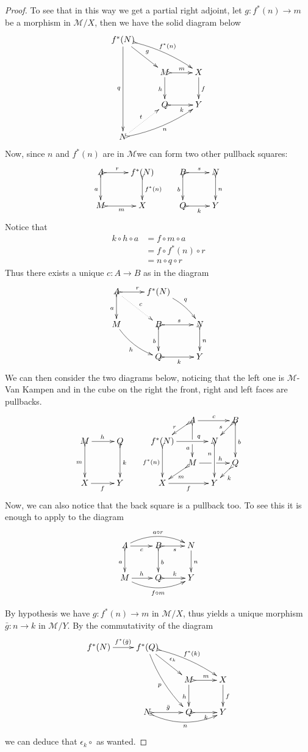 \documentclass[a4paper]{article}
\def\X{\textbf {\textup{X}}}
\theoremstyle{definition}
\begin{document}
\begin{proof}
To see that in this way we get a partial right adjoint, let $g\colon f^*(n)\to m $ be a morphism in $\mathcal{M}/X$, then we have the solid diagram below
\[\xymatrix{f^*(N) \ar[dr]^{g} \ar@{>->}@/^.2cm/[drr]^{f^*(n)} \ar[ddd]_{q}\\& M \ar@{>->}[r]^{m}\ar[d]_{h}& X \ar[d]^f \\&Q\ar@{>->}[r]_{k}&Y\\N \ar@{>->}@/_.2cm/[urr]_{n} \ar@{.>}[ur]^{t}}\]
Now, since $n$ and $f^*(n)$ are in $\mathcal{M}$we can form two other pullback squares:
\[\xymatrix{A \ar@{>->}[d]_{a}\ar@{>->}[r]^-{r}& f^*(N) \ar@{>->}[d]^{f^*(n)} & B \ar@{>->}[r]^{s} \ar@{>->}[d]_{b}& N \ar@{>->}[d]^{n}\\M \ar@{>->}[r]_{m}&X &Q \ar@{>->}[r]_k&Y\\}\]
Notice that 
\begin{align*}
	k\circ h\circ a&=f\circ m\circ a\\&=f\circ f^*(n)\circ r\\&=n\circ q \circ r
\end{align*}
Thus there exists a unique $c\colon A\to B$ as in the diagram
\[\xymatrix{A \ar@{>->}[d]_{a} \ar@{.>}[dr]^{c}\ar@{>->}[r]^{r} &f^*(N) \ar@/^.2cm/[dr]^{q} \\ M \ar@/_.2cm/[dr]_{h}&B\ar@{>->}[r]^{s}  \ar@{>->}[d]_{b}& N \ar@{>->}[d]^{n}\\ &Q \ar@{>->}[r]_{k} & Y}\]
We can then consider the two diagrams below, noticing that the left one is $\mathcal{M}$-Van Kampen and in the cube on the right the front, right and left faces are pullbacks.
		\[\xymatrix@C=10pt@R=10pt{&&&&&A\ar@{>->}[dd]|\hole_(.65){a}\ar[rr]^{c} \ar@{>->}[dl]_{r} && B \ar@{>->}[dd]^{b} \ar@{>->}[dl]_{s} \\ M \ar@{>->}[dd]_{m}\ar[rr]^{h}&&Q\ar@{>->}[dd]^{k}&&f^*(N)  \ar@{>->}[dd]_{f^*(n)}\ar[rr]^(.7){q} & & N \ar@{>->}[dd]_(.3){n}\\&&&&&M\ar[rr]|\hole^(.65){h} \ar@{>->}[dl]^{m} && Q \ar@{>->}[dl]^{k} \\X\ar[rr]_{f} &&Y&&X \ar[rr]_{f} & & Y}\]
Now, we can also notice that the back square is a pullback too. To see this it is enough to apply  to the diagram
\[\xymatrix{A  \ar@/^.4cm/[rr]^{a\circ r}\ar@{>->}[d]_{a} \ar[r]_{c}& \ar@{>->}[r]_{s}B \ar@{>->}[d]^{b}& N \ar[d]^{n}\\ M \ar@/_.4cm/[rr]_{f\circ m}\ar[r]^{h}& Q \ar@{>->}[r]^{k}& Y}\]

By hypothesis we have $g\colon f^*(n)\to m$ in $\mathcal{M}/X$, thus  yields a unique morphism $\bar{g}\colon n\to k$ in $\mathcal{M}/Y$. By the commutativity of the diagram
\[\xymatrix{f^*(N) \ar[r]^{f^*(\bar{g})}& f^*(Q) \ar[dr]^{\epsilon_k} \ar@{>->}@/^.2cm/[drr]^{f^*(k)} \ar@/_.2cm/[ddr]_{p}\\&& M \ar@{>->}[r]^{m}\ar[d]_{h}& X \ar[d]^f \\&N \ar@{>->}[r]^{\bar{g}} \ar@{>->}@/_.4cm/[rr]_{n} &Q\ar@{>->}[r]_{k}&Y}\]
we can deduce that $\epsilon_k \circ $ as wanted.
\end{proof}
\end{document}
